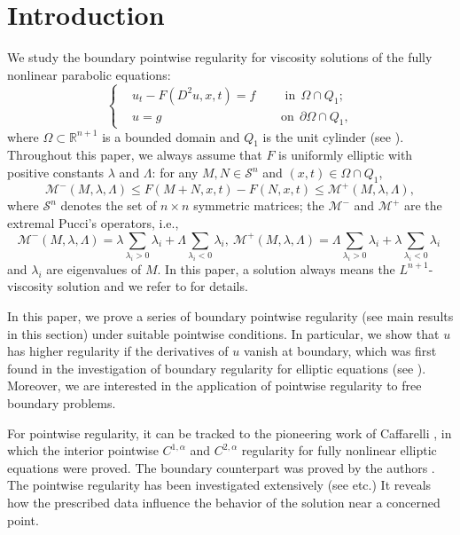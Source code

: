 \documentclass[preprint,12pt]{elsarticle}
\theoremstyle{definition}
\theoremstyle{remark}
\numberwithin{equation}{section}
\begin{document}
\section{Introduction}\label{S1}
We study the boundary pointwise regularity for viscosity solutions of the fully nonlinear parabolic equations:
\begin{equation}\label{e.Dirichlet}
\left\{\begin{aligned}
&u_t-F(D^2u,x,t)=f&& ~~\mbox{ in}~~\Omega\cap Q_1;\\
&u=g&& ~~\mbox{on}~~\partial \Omega\cap Q_1,
\end{aligned}\right.
\end{equation}
where $\Omega \subset \mathbb{R}^{n+1}$ is a bounded domain and $Q_1$ is the unit cylinder (see ). Throughout this paper, we always assume that $F$ is uniformly elliptic with positive constants $\lambda$ and $\Lambda$: for any $M,N\in \mathcal{S}^n$ and $(x,t)\in \Omega\cap Q_1$,
\begin{equation}\label{e1.0}
\mathcal{M}^-(M,\lambda,\Lambda)\leq F(M+N,x,t)-F(N,x,t)
\leq \mathcal{M}^+(M,\lambda,\Lambda),
\end{equation}
where $\mathcal{S}^n$ denotes the set of $n\times n$ symmetric matrices; the $\mathcal{M}^-$ and $\mathcal{M}^+$ are the extremal Pucci's operators, i.e.,
\begin{equation*}
\mathcal{M}^-(M,\lambda,\Lambda)=\lambda\sum_{\lambda_i>0} \lambda_i+
\Lambda\sum_{\lambda_i<0} \lambda_i,~
\mathcal{M}^+(M,\lambda,\Lambda)=\Lambda\sum_{\lambda_i>0} \lambda_i+
\lambda\sum_{\lambda_i<0} \lambda_i~
\end{equation*}
and $\lambda_i$ are eigenvalues of $M$. In this paper, a solution always means the $L^{n+1}$-viscosity solution and we refer to \cite{MR1789919} for details.

In this paper, we prove a series of boundary pointwise regularity (see main results in this section) under suitable pointwise conditions. In particular, we show that $u$ has higher regularity if the derivatives of $u$ vanish at boundary, which was first found in the investigation of boundary regularity for elliptic equations (see \cite{MR4088470}). Moreover, we are interested in the application of pointwise regularity to free boundary problems.

For pointwise regularity, it can be tracked to the pioneering work of Caffarelli \cite{MR1005611}, in which the interior pointwise $C^{1,\alpha}$ and $C^{2,\alpha}$ regularity for fully nonlinear elliptic equations were proved. The boundary counterpart was proved by the authors \cite{MR4088470}. The pointwise regularity has been investigated extensively (see \cite{lian2020pointwise,MR3980853,MR2334822,MR2983006,MR3246039,MR2592289} etc.)
It reveals how the prescribed data influence the behavior of the solution near a concerned point.
\end{document}
